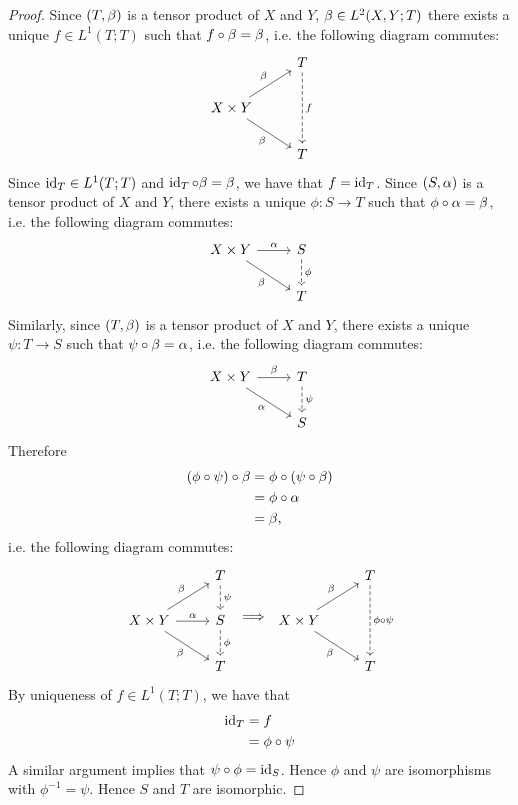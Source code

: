 \documentclass{book}
\begin{document}
	\begin{proof}
		Since $(T, \beta)$ is a tensor product of $X$ and $Y$, $\beta \in L^2(X,Y; T)$ there exists a unique $f \in L^1(T;T)$ such that $f \circ \beta = \beta$, i.e. the following diagram commutes: 
		\[ 
		\begin{tikzcd}
			& T \arrow[dd, dashed, "f"] \\
			X \times Y \arrow[ur, "\be"] \arrow[dr, "\be"'] 
			&   \\
			& T 
		\end{tikzcd}
		\] 
		Since $\operatorname{id}_T \in L^1(T;T)$ and $\operatorname{id}_T \circ \beta = \beta$, we have that $f = \operatorname{id}_T$. Since $(S, \alpha)$ is a tensor product of $X$ and $Y$, there exists a unique $\phi: S \rightarrow T$ such that $\phi \circ \alpha = \beta$, i.e. the following diagram commutes: 
		\[ 
		\begin{tikzcd}
			X \times Y \arrow[r, "\al"] \arrow[dr, "\be"'] 	
			& S  \arrow[d, dashed, "\phi"] \\
			& T 
		\end{tikzcd}
		\] 
		Similarly, since $(T, \beta)$ is a tensor product of $X$ and $Y$, there exists a unique $\psi: T \rightarrow S$ such that $\psi \circ \beta = \alpha$, i.e. the following diagram commutes: 
		\[ 
		\begin{tikzcd}
			X \times Y \arrow[r, "\be"] \arrow[dr, "\al"'] 	
			& T  \arrow[d, dashed, "\psi"] \\
			& S 
		\end{tikzcd}
		\] 
		Therefore 
		\begin{align*}
			(\phi \circ \psi) \circ \beta 
			& = \phi \circ (\psi \circ \beta) \\
			& = \phi \circ \alpha \\
			& = \beta, 
		\end{align*}
		i.e. the following diagram commutes:
		\[ 
		\begin{tikzcd}
			& T \arrow[d, dashed, "\psi"] \\
			X \times Y \arrow[ur, "\be"] \arrow[dr, "\be"'] \arrow[r, "\al"]	
			& S  \arrow[d, dashed, "\phi"] \\
			& T 
		\end{tikzcd}
		\implies
		\begin{tikzcd}
			& T \arrow[dd, dashed, "\phi \circ \psi"] \\
			X \times Y \arrow[ur, "\be"] \arrow[dr, "\be"'] 
			&  \\
			& T 
		\end{tikzcd}
		\] 
		By uniqueness of $f \in L^1(T;T)$, we have that 
		\begin{align*}
			\operatorname{id}_T
			& = f \\
			& = \phi \circ \psi 
		\end{align*}
		A similar argument implies that $\psi \circ \phi = \operatorname{id}_S$. Hence $\phi$ and $\psi$ are isomorphisms with $\phi^{-1} = \psi$. Hence $S$ and $T$ are isomorphic.
	\end{proof}
	
\end{document}

